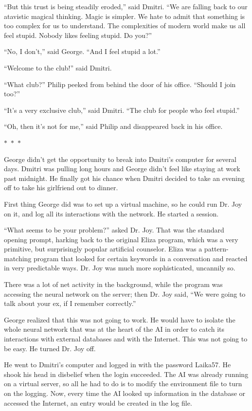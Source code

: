 \documentclass{memoir}
\newcommand{\starbreak}{%
\begin{center}
  $\ast$~$\ast$~$\ast$
\end{center}
}
\begin{document}
``But this trust is being steadily eroded,'' said Dmitri. ``We are falling back to our atavistic magical thinking. Magic is simpler. We hate to admit that something is too complex for us to understand. The complexities of modern world make us all feel stupid. Nobody likes feeling stupid. Do you?''

``No, I don't,'' said George. ``And I feel stupid a lot.''

``Welcome to the club!'' said Dmitri.

``What club?'' Philip peeked from behind the door of his office. ``Should I join too?''

``It's a very exclusive club,'' said Dmitri. ``The club for people who feel stupid.''

``Oh, then it's not for me,'' said Philip and disappeared back in his office.

\starbreak

George didn't get the opportunity to break into Dmitri's computer for several days. Dmitri was pulling long hours and George didn't feel like staying at work past midnight. He finally got his chance when Dmitri decided to take an evening off to take his girlfriend out to dinner. 

First thing George did was to set up a virtual machine, so he could run Dr. Joy on it, and log all its interactions with the network. He started a session. 

``What seems to be your problem?'' asked Dr. Joy. That was the standard opening prompt, harking back to the original Eliza program, which was a very primitive, but surprisingly popular artificial counselor. Eliza was a pattern-matching program that looked for certain keywords in a conversation and reacted in very predictable ways. Dr. Joy was much more sophisticated, uncannily so.

There was a lot of net activity in the background, while the program was accessing the neural network on the server; then Dr. Joy said, ``We were going to talk about your ex, if I remember correctly.''

George realized that this was not going to work. He would have to isolate the whole neural network that was at the heart of the AI in order to catch its interactions with external databases and with the Internet. This was not going to be easy. He turned Dr. Joy off.

He went to Dmitri's computer and logged in with the password Laika57. He shook his head in disbelief when the login succeeded. The AI was already running on a virtual server, so all he had to do is to modify the environment file to turn on the logging. Now, every time the AI looked up information in the database or accessed the Internet, an entry would be created in the log file.
\end{document}
